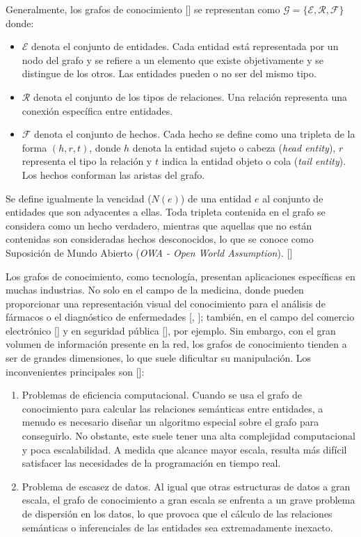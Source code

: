 Generalmente, los grafos de conocimiento [\cite{survey}] se representan como $\mathcal{G} = \lbrace \mathcal{E}, \mathcal{R}, \mathcal{F} \rbrace$ donde:
\begin{itemize}
    \item $\mathcal{E}$ denota el conjunto de entidades. Cada entidad está representada por un nodo del grafo y se refiere a un elemento que existe objetivamente y se distingue de los otros. Las entidades pueden o no ser del mismo tipo.
    \item $\mathcal{R}$ denota el conjunto de los tipos de relaciones. Una relación representa una conexión específica entre entidades.
    \item $\mathcal{F}$ denota el conjunto de hechos. Cada hecho se define como una tripleta de la forma $(h, r, t)$, donde $h$ denota la entidad sujeto o cabeza (\textit{head entity}), $r$ representa el tipo la relación y $t$ indica la entidad objeto o cola (\textit{tail entity}). Los hechos conforman las aristas del grafo.
\end{itemize}

Se define igualmente la vencidad ($N(e)$) de una entidad $e$ al conjunto de entidades que son adyacentes a ellas. Toda tripleta contenida en el grafo se considera como un hecho verdadero, mientras que aquellas que no están contenidas son consideradas hechos desconocidos, lo que se conoce como Suposición de Mundo Abierto (\textit{OWA - Open World Assumption}). [\cite{taskdriven}]

Los grafos de conocimiento, como tecnología, presentan aplicaciones específicas en muchas industrias. No solo en el campo de la medicina, donde pueden proporcionar una representación visual del conocimiento para el análisis de fármacos o el diagnóstico de enfermedades [\cite{sang}, \cite{abdel}]; también, en el campo del comercio electrónico [\cite{commerce}] y en seguridad pública [\cite{security}], por ejemplo. Sin embargo, con el gran volumen de información presente en la red, los grafos de conocimiento tienden a ser de grandes dimensiones, lo que suele dificultar su manipulación. Los inconvenientes principales son [\cite{dai}]:

\begin{enumerate}[i]
    \item Problemas de eficiencia computacional. Cuando se usa el grafo de conocimiento para calcular las relaciones semánticas entre entidades, a menudo es necesario diseñar un algoritmo especial sobre el grafo para conseguirlo. No obstante, este suele tener una alta complejidad computacional y poca escalabilidad. A medida que alcance mayor escala, resulta más difícil satisfacer las necesidades de la programación en tiempo real.
    \item Problema de escasez de datos. Al igual que otras estructuras de datos a gran escala, el grafo de conocimiento a gran escala se enfrenta a un grave problema de dispersión en los datos, lo que provoca que el cálculo de las relaciones semánticas o inferenciales de las entidades sea extremadamente inexacto.
\end{enumerate}
    

